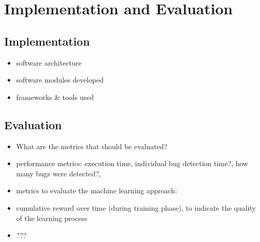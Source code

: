 \section{Implementation and Evaluation}

\subsection{Implementation}
\begin{itemize}
    \item software architecture
    \item software modules developed
    \item frameworks \& tools used
\end{itemize}

\subsection{Evaluation}

\begin{itemize}
    \item What are the metrics that should be evaluated?
    \item performance metrics: execution time, individual bug detection time?, how many bugs were detected?,
    \item metrics to evaluate the machine learning approach:
    \item cumulative reward over time (during training phase), to indicate the quality of the learning process
    \item ???
\end{itemize}